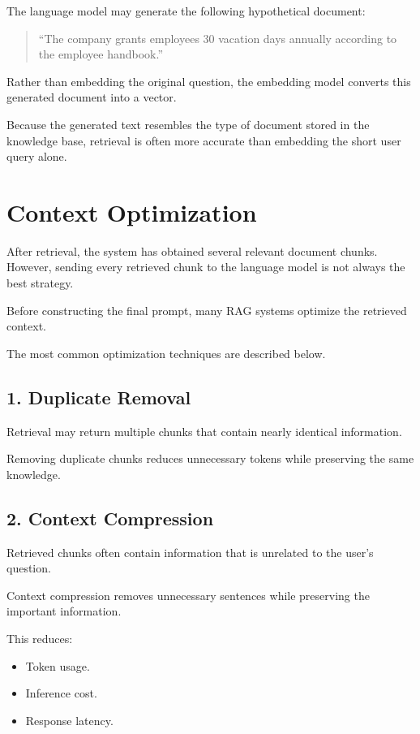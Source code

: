 The language model may generate the following hypothetical document:

\begin{quote}
``The company grants employees 30 vacation days annually according to the employee handbook.''
\end{quote}

Rather than embedding the original question, the embedding model converts this generated document into a vector.

Because the generated text resembles the type of document stored in the knowledge base, retrieval is often more accurate than embedding the short user query alone.
\section{Context Optimization}

After retrieval, the system has obtained several relevant document chunks. However, sending every retrieved chunk to the language model is not always the best strategy.

Before constructing the final prompt, many RAG systems optimize the retrieved context.

The most common optimization techniques are described below.

\subsection*{1. Duplicate Removal}

Retrieval may return multiple chunks that contain nearly identical information.

Removing duplicate chunks reduces unnecessary tokens while preserving the same knowledge.

\subsection*{2. Context Compression}

Retrieved chunks often contain information that is unrelated to the user's question.

Context compression removes unnecessary sentences while preserving the important information.

This reduces:

\begin{itemize}
    \item Token usage.
    \item Inference cost.
    \item Response latency.
\end{itemize}

